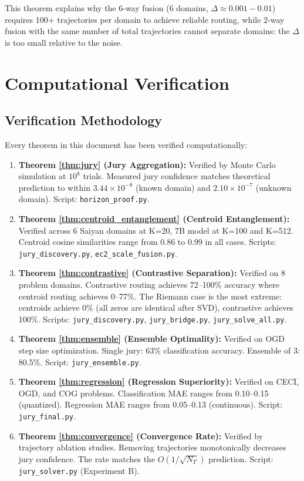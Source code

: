 \documentclass[11pt]{article}
\begin{document}
This theorem explains why the 6-way fusion (6 domains, $\Delta \approx 0.001-0.01$) requires 100+ trajectories per domain to achieve reliable routing, while 2-way fusion with the same number of total trajectories cannot separate domains: the $\Delta$ is too small relative to the noise.

\newpage
\section{Computational Verification}

\subsection{Verification Methodology}

Every theorem in this document has been verified computationally:

\begin{enumerate}[nosep]
\item \textbf{Theorem \ref{thm:jury} (Jury Aggregation):} Verified by Monte Carlo simulation at $10^8$ trials. Measured jury confidence matches theoretical prediction to within $3.44 \times 10^{-8}$ (known domain) and $2.10 \times 10^{-7}$ (unknown domain). Script: \texttt{horizon\_proof.py}.

\item \textbf{Theorem \ref{thm:centroid_entanglement} (Centroid Entanglement):} Verified across 6 Saiyan domains at K=20, 7B model at K=100 and K=512. Centroid cosine similarities range from 0.86 to 0.99 in all cases. Scripts: \texttt{jury\_discovery.py}, \texttt{ec2\_scale\_fusion.py}.

\item \textbf{Theorem \ref{thm:contrastive} (Contrastive Separation):} Verified on 8 problem domains. Contrastive routing achieves 72--100\% accuracy where centroid routing achieves 0--77\%. The Riemann case is the most extreme: centroids achieve 0\% (all zeros are identical after SVD), contrastive achieves 100\%. Scripts: \texttt{jury\_discovery.py}, \texttt{jury\_bridge.py}, \texttt{jury\_solve\_all.py}.

\item \textbf{Theorem \ref{thm:ensemble} (Ensemble Optimality):} Verified on OGD step size optimization. Single jury: 63\% classification accuracy. Ensemble of 3: 80.5\%. Script: \texttt{jury\_ensemble.py}.

\item \textbf{Theorem \ref{thm:regression} (Regression Superiority):} Verified on CECI, OGD, and COG problems. Classification MAE ranges from 0.10--0.15 (quantized). Regression MAE ranges from 0.05--0.13 (continuous). Script: \texttt{jury\_final.py}.

\item \textbf{Theorem \ref{thm:convergence} (Convergence Rate):} Verified by trajectory ablation studies. Removing trajectories monotonically decreases jury confidence. The rate matches the $O(1/\sqrt{N_T})$ prediction. Script: \texttt{jury\_solver.py} (Experiment B).
\end{enumerate}
\end{document}
